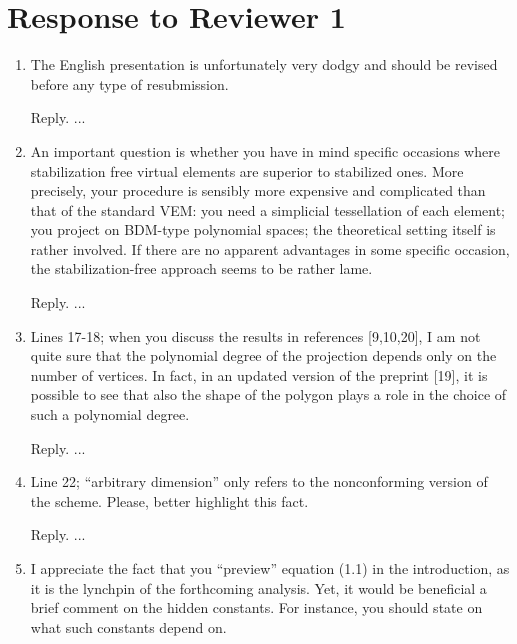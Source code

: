 \documentclass[10pt]{amsart}
\theoremstyle{definition}
\theoremstyle{remark}
\begin{document}
\section{Response to Reviewer 1}
\begin{enumerate}[1.]

\item \textsf{The English presentation is unfortunately very dodgy and should be revised before any type of resubmission.}

\smallskip \noindent \textcolor[rgb]{1.00,0.00,0.00}{Reply.}
...


\medskip

\item \textsf{An important question is whether you have in mind specific occasions where stabilization free virtual elements are superior to stabilized ones. More precisely, your procedure is sensibly more expensive and complicated than that of the standard VEM: you need a simplicial tessellation of each element; you project on BDM-type polynomial spaces; the theoretical setting itself is rather involved. If there are no apparent advantages in some specific occasion, the stabilization-free approach seems to be rather lame.}

\smallskip \noindent \textcolor[rgb]{1.00,0.00,0.00}{Reply.}
...

\medskip

\item \textsf{Lines 17-18; when you discuss the results in references [9,10,20], I am not quite sure that the polynomial degree of the projection depends only on the number of vertices. In fact, in an updated version of the preprint [19], it is possible to see that also the shape of the polygon plays a role in the choice of such a polynomial degree.}

\smallskip \noindent \textcolor[rgb]{1.00,0.00,0.00}{Reply.}
...

\medskip

\item \textsf{Line 22; ``arbitrary dimension'' only refers to the nonconforming version of the scheme. Please, better highlight this fact.}

\smallskip \noindent \textcolor[rgb]{1.00,0.00,0.00}{Reply.}
...

\medskip

\item \textsf{I appreciate the fact that you “preview” equation (1.1) in the introduction, as it is the lynchpin of the forthcoming analysis. Yet, it would be beneficial a brief comment on the hidden constants. For instance, you should state on what such constants depend on.}


\end{enumerate}
\end{document}
